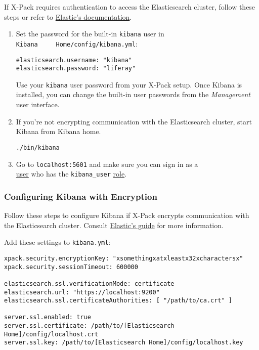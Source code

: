 If X-Pack requires authentication to access the Elasticsearch cluster,
follow these steps or refer to
\href{https://www.elastic.co/guide/en/kibana/6.1/monitoring-xpack-kibana.html}{Elastic's
documentation}.

\begin{enumerate}
\def\labelenumi{\arabic{enumi}.}
\item
  Set the password for the built-in \texttt{kibana} user in
  \texttt{Kibana\ \ \ \ \ Home/config/kibana.yml}:

\begin{verbatim}
elasticsearch.username: "kibana"
elasticsearch.password: "liferay"
\end{verbatim}

  Use your \texttt{kibana} user password from your X-Pack setup. Once
  Kibana is installed, you can change the built-in user passwords from
  the \emph{Management} user interface.
\item
  If you're not encrypting communication with the Elasticsearch cluster,
  start Kibana from Kibana home.

\begin{verbatim}
./bin/kibana
\end{verbatim}
\item
  Go to \texttt{localhost:5601} and make sure you can sign in as a\\
  \href{https://www.elastic.co/guide/en/x-pack/6.1/native-realm.html\#native-add}{user}
  who has the \texttt{kibana\_user}
  \href{https://www.elastic.co/guide/en/x-pack/6.1/built-in-roles.html}{role}.
\end{enumerate}

\subsubsection{Configuring Kibana with
Encryption}\label{configuring-kibana-with-encryption-1}

Follow these steps to configure Kibana if X-Pack encrypts communication
with the Elasticsearch cluster. Consult
\href{https://www.elastic.co/guide/en/kibana/6.1/using-kibana-with-security.html\#using-kibana-with-security}{Elastic's
guide} for more information.

Add these settings to \texttt{kibana.yml}:

\begin{verbatim}
xpack.security.encryptionKey: "xsomethingxatxleastx32xcharactersx"
xpack.security.sessionTimeout: 600000

elasticsearch.ssl.verificationMode: certificate
elasticsearch.url: "https://localhost:9200"
elasticsearch.ssl.certificateAuthorities: [ "/path/to/ca.crt" ]

server.ssl.enabled: true
server.ssl.certificate: /path/to/[Elasticsearch Home]/config/localhost.crt
server.ssl.key: /path/to/[Elasticsearch Home]/config/localhost.key
\end{verbatim}

